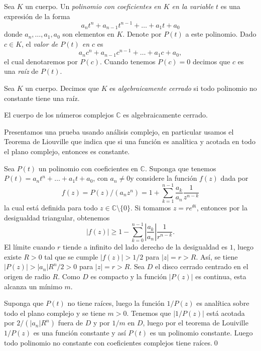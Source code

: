 \begin{defn}
Sea $K$ un cuerpo. Un \emph{polinomio con coeficientes en $K$ en la variable $t$} es una expresi\'on de la forma
$$a_nt^n+a_{n-1}t^{n-1}+\ldots+a_1t+a_0$$
donde $a_n,\ldots,a_1,a_0$ son elementos en $K$. Denote por $P(t)$ a este polinomio. Dado $c\in K$, el \emph{valor de $P(t)$ en $c$} es
$$a_nc^n+a_{n-1}c^{n-1}+\ldots+a_1c+a_0,$$
el cual denotaremos por $P(c)$. Cuando tenemos $P(c)=0$ decimos que $c$ es una \emph{ra\'iz} de $P(t)$.
\end{defn}

\begin{defn}
Sea $K$ un cuerpo. Decimos que $K$ es \emph{algebraicamente cerrado} si todo polinomio no constante tiene una ra\'iz.
\end{defn}

\begin{teo}
El cuerpo de los n\'umeros complejos $\mathbb{C}$ es algebraicamente cerrado.
\end{teo}

\dem Presentamos una prueba usando an\'alisis complejo, en particular usamos el Teorema de Liouville que indica que si una funci\'on es anal\'itica y acotada en todo el plano complejo, entonces es constante.

Sea $P(t)$ un  polinomio  con coeficientes en $\mathbb{C}$. Suponga que tenemos $P(t)=a_nt^n+\ldots+a_1t+a_0$, con $a_n\ne 0$y considere la funci\'on $f(z)$ dada por 
$$f(z)=P(z)/(a_nz^n)=1+\sum_{k=1}^{n-1}\dfrac{a_k}{a_n}\dfrac{1}{z^{n-k}}$$
la cual est\'a definida para todo $z\in\mathbb{C}\setminus\{0\}$. Si tomamos $z=re^{\theta i}$, entonces por la desigualdad triangular, obtenemos
$$ |f(z)| \ge 1-\sum_{k=0}^{n-1}\left|\dfrac{a_k}{a_n}\right|\dfrac{1}{r^{n-k}}.$$
El l\'imite cuando $r$ tiende a infinito del lado derecho de la desigualdad es $1$, luego existe $R>0$ tal que se cumple $|f(z)|>1/2$ para $|z|=r>R$. As\'i, se tiene $|P(z)|>|a_n|R^n/2>0$ para $|z|=r>R$. Sea $D$ el disco cerrado centrado en el origen de radio $R$. Como $D$ es compacto y la funci\'on $|P(z)|$ es continua, esta alcanza un m\'inimo $m$.

Suponga que $P(t)$ no tiene ra\'ices, luego la funci\'on $1/P(z)$ es anal\'itica sobre todo el plano complejo y se tiene $m>0$. Tenemos que $|1/P(z)|$ est\'a acotada por $2/(|a_n|R^n)$ fuera de $D$ y por $1/m$ en $D$, luego por el teorema de Louiville $1/P(z)$ es una funci\'on constante y as\'i $P(t)$ es un polinomio constante. Luego todo polinomio no constante con coeficientes complejos tiene ra\'ices.\qed

